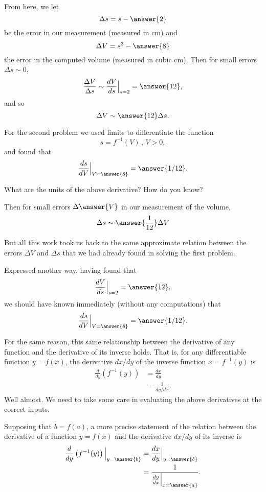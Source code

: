 \documentclass{ximera}
\begin{document}
\begin{question}  \label{QDDFDSFet}
From here, we let 
\[
         \Delta s = s- \answer{2}
\]
be the error in our measurement (measured in cm) and 
\[
      \Delta V = s^3 -  \answer{8}
\]
the error in the computed volume (measured in cubic cm). Then for small errors $\Delta s \sim 0$, 
\[
       \frac{\Delta V}{\Delta s} \sim  \frac{dV}{ds}\Big|_{s=2} = \answer{12} ,
\]
and so
\[
       \Delta V \sim \answer{12} \Delta s.
\]

For the second problem we used limits to differentiate the function
\[
    s = f^{-1}(V) \, , \, V>0 ,
\] 
and found that
\[
    \frac{ds}{dV}\Big|_{V=\answer{8}} = \answer{1/12}. 
\]
\begin{question}  \label{Q:Lldfb9833}
What are the units of the above derivative? How do you know?
\end{question}

Then for small errors  $\Delta \answer{V}$ in our measurement of the volume,
\[
  \Delta s \sim \answer{\frac{1}{12}} \Delta V
\]

But all this work took us back to the same approximate relation between the errors $\Delta V$ and $\Delta s$ that we had already found in solving the first problem.

Expressed another way, having found that
\[
        \frac{dV}{ds}\Big|_{s=2} = \answer{12},
\]
we should have known immediately (without any computations) that
\[
        \frac{ds}{dV}\Big|_{V=\answer{8}} = \answer{1/12}.
\]



For the same reason, this same relationship between the derivative of any function and the derivative of its inverse holds. That is, for any differentiable function $y=f(x)$, the derivative $dx/dy$ of the inverse function $x = f^{-1}(y)$ is
\begin{align*}
\frac{d}{dy} \left(  f^{-1}(y)  \right)  &= \frac{dx}{dy}  \\
                                                      & = \frac{1}{dy/dx} .
\end{align*}
Well almost. We need to take some care in evaluating the above derivatives at the correct inputs.

Supposing that $b = f(a)$, a more precise statement of the relation between the derivative of a function $y=f(x)$ and the derivative $dx/dy$ of its inverse is
\begin{align*}
\frac{d}{dy} \left(  f^{-1}(y)  \right)\Big|_{y=\answer{b}}  &= \frac{dx}{dy} \Big|_{y=\answer{b}} \\
                                                      & = \frac{1}{\frac{dy}{dx} \Big|_{x=\answer{a}}} .
\end{align*}


\end{question}
\end{document}
